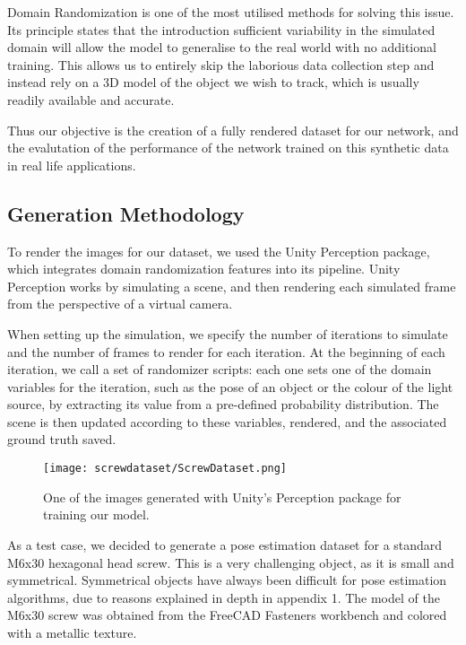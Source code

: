 Domain Randomization\cite{domainRandomization} is one of the most utilised methods for solving this issue. Its principle states that the introduction sufficient variability in the simulated domain will allow the model to generalise to the real world with no additional training. This allows us to entirely skip the laborious data collection step and instead rely on a 3D model of the object we wish to track, which is usually readily available and accurate.

Thus our objective is the creation of a fully rendered dataset for our network, and the evalutation of the performance of the network trained on this synthetic data in real life applications.

\subsection{Generation Methodology}
\label{ss:ScrewDataset}

To render the images for our dataset, we used the Unity Perception package\cite{unityPerception}, which integrates domain randomization features into its pipeline. Unity Perception works by simulating a scene, and then rendering each simulated frame from the perspective of a virtual camera. 

When setting up the simulation, we specify the number of iterations to simulate and the number of frames to render for each iteration. At the beginning of each iteration, we call a set of randomizer scripts: each one sets one of the domain variables for the iteration, such as the pose of an object or the colour of the light source, by extracting its value from a pre-defined probability distribution. The scene is then updated according to these variables, rendered, and the associated ground truth saved.

\begin{figure}
    \centering
    \texttt{[image: screwdataset/ScrewDataset.png]}
    \caption{One of the images generated with Unity's Perception package for training our model.}
    \label{fig:screwdataset}
\end{figure}

As a test case, we decided to generate a pose estimation dataset for a standard M6x30 hexagonal head screw. This is a very challenging object, as it is small and symmetrical. Symmetrical objects have always been difficult for pose estimation algorithms, due to reasons explained in depth in appendix 1. The model of the M6x30 screw was obtained from the FreeCAD Fasteners workbench\cite{Fasteners} and colored with a metallic texture.

